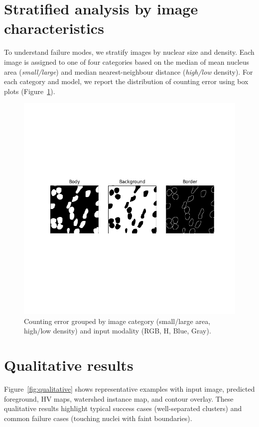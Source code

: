 \documentclass[target=bach,aauheader=,style=]{thud}
\begin{document}
\section{Stratified analysis by image characteristics}
\label{sec:strata}
To understand failure modes, we stratify images by nuclear size and density. 
Each image is assigned to one of four categories based on the median of mean nucleus area (\emph{small/large}) and median nearest-neighbour distance (\emph{high/low} density). 
For each category and model, we report the distribution of counting error using box plots (Figure~\ref{fig:box-cats}).

\begin{figure}[ht]
    \centering
    \includegraphics[width=.9\linewidth]{imgs/3ch_binarymask.png}
    \caption{Counting error grouped by image category (small/large area, high/low density) and input modality (RGB, H, Blue, Gray).}
    \label{fig:box-cats}
\end{figure}

\section{Qualitative results}
Figure~\ref{fig:qualitative} shows representative examples with input image, predicted foreground, HV maps, watershed instance map, and contour overlay. 
These qualitative results highlight typical success cases (well-separated clusters) and common failure cases (touching nuclei with faint boundaries).
\end{document}
